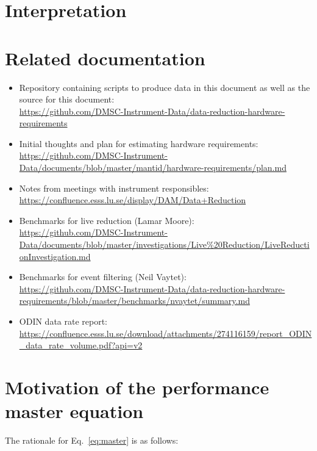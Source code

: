 \documentclass[a4paper,english,numbers=noenddot,bibliography=totoc,chapterprefix=on,DIV=12]{scrartcl}
\newcommand{\odin}{ODIN\xspace}
\begin{document}
\section{Interpretation}




\appendix

\section{Related documentation}
\label{app:refs}

\begin{itemize}
  \item Repository containing scripts to produce data in this document as well as the source for this document:\\
    \url{https://github.com/DMSC-Instrument-Data/data-reduction-hardware-requirements}
  \item Initial thoughts and plan for estimating hardware requirements:\\
    \url{https://github.com/DMSC-Instrument-Data/documents/blob/master/mantid/hardware-requirements/plan.md}
  \item Notes from meetings with instrument responsibles:\\
    \url{https://confluence.esss.lu.se/display/DAM/Data+Reduction}
  \item Benchmarks for live reduction (Lamar Moore):\\
    \url{https://github.com/DMSC-Instrument-Data/documents/blob/master/investigations/Live%20Reduction/LiveReductionInvestigation.md}
  \item Benchmarks for event filtering (Neil Vaytet):\\
    \url{https://github.com/DMSC-Instrument-Data/data-reduction-hardware-requirements/blob/master/benchmarks/nvaytet/summary.md}
  \item \odin data rate report:\\
    \url{https://confluence.esss.lu.se/download/attachments/274116159/report_ODIN_data_rate_volume.pdf?api=v2}
\end{itemize}

\section{Motivation of the performance master equation}
\label{app:master_eq}

The rationale for Eq.~\eqref{eq:master} is as follows:
\end{document}
